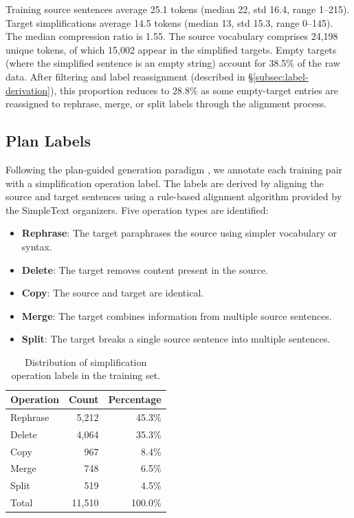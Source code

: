 \documentclass{ceurart}
\begin{document}
Training source sentences average 25.1 tokens (median 22, std 16.4, range 1--215). Target simplifications average 14.5 tokens (median 13, std 15.3, range 0--145). The median compression ratio is 1.55.
The source vocabulary comprises 24,198 unique tokens, of which 15,002 appear in the simplified targets.
Empty targets (where the simplified sentence is an empty string) account for 38.5\% of the raw data.
After filtering and label reassignment (described in \S\ref{subsec:label-derivation}), this proportion reduces to 28.8\% as some empty-target entries are reassigned to rephrase, merge, or split labels through the alignment process.

\subsection{Plan Labels}

Following the plan-guided generation paradigm \cite{martin2022muss, narayan2021planning}, we annotate each training pair with a simplification operation label.
The labels are derived by aligning the source and target sentences using a rule-based alignment algorithm provided by the SimpleText organizers.
Five operation types are identified:

\begin{itemize}
    \item \textbf{Rephrase}: The target paraphrases the source using simpler vocabulary or syntax.
    \item \textbf{Delete}: The target removes content present in the source.
    \item \textbf{Copy}: The source and target are identical.
    \item \textbf{Merge}: The target combines information from multiple source sentences.
    \item \textbf{Split}: The target breaks a single source sentence into multiple sentences.
\end{itemize}

\begin{table}[t]
\centering
\caption{Distribution of simplification operation labels in the training set.}
\label{tab:label-dist}
\begin{tabular}{lrr}
\toprule
Operation & Count & Percentage \\
\midrule
Rephrase  & 5,212 & 45.3\% \\
Delete    & 4,064 & 35.3\% \\
Copy      &   967 &  8.4\% \\
Merge     &   748 &  6.5\% \\
Split     &   519 &  4.5\% \\
\midrule
Total     & 11,510 & 100.0\% \\
\bottomrule
\end{tabular}
\end{table}
\end{document}
